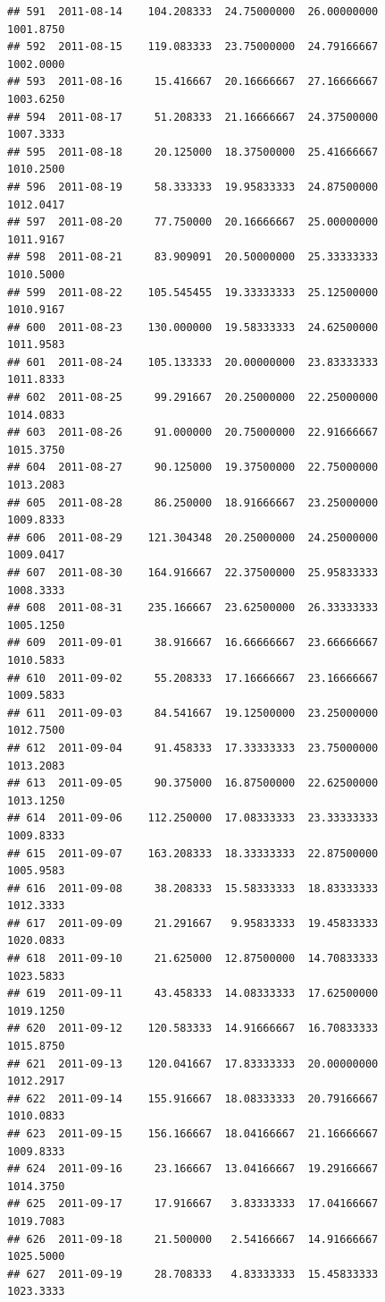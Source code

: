 \documentclass[
]{article}
\begin{document}
\begin{verbatim}
## 591  2011-08-14    104.208333  24.75000000  26.00000000    1001.8750
## 592  2011-08-15    119.083333  23.75000000  24.79166667    1002.0000
## 593  2011-08-16     15.416667  20.16666667  27.16666667    1003.6250
## 594  2011-08-17     51.208333  21.16666667  24.37500000    1007.3333
## 595  2011-08-18     20.125000  18.37500000  25.41666667    1010.2500
## 596  2011-08-19     58.333333  19.95833333  24.87500000    1012.0417
## 597  2011-08-20     77.750000  20.16666667  25.00000000    1011.9167
## 598  2011-08-21     83.909091  20.50000000  25.33333333    1010.5000
## 599  2011-08-22    105.545455  19.33333333  25.12500000    1010.9167
## 600  2011-08-23    130.000000  19.58333333  24.62500000    1011.9583
## 601  2011-08-24    105.133333  20.00000000  23.83333333    1011.8333
## 602  2011-08-25     99.291667  20.25000000  22.25000000    1014.0833
## 603  2011-08-26     91.000000  20.75000000  22.91666667    1015.3750
## 604  2011-08-27     90.125000  19.37500000  22.75000000    1013.2083
## 605  2011-08-28     86.250000  18.91666667  23.25000000    1009.8333
## 606  2011-08-29    121.304348  20.25000000  24.25000000    1009.0417
## 607  2011-08-30    164.916667  22.37500000  25.95833333    1008.3333
## 608  2011-08-31    235.166667  23.62500000  26.33333333    1005.1250
## 609  2011-09-01     38.916667  16.66666667  23.66666667    1010.5833
## 610  2011-09-02     55.208333  17.16666667  23.16666667    1009.5833
## 611  2011-09-03     84.541667  19.12500000  23.25000000    1012.7500
## 612  2011-09-04     91.458333  17.33333333  23.75000000    1013.2083
## 613  2011-09-05     90.375000  16.87500000  22.62500000    1013.1250
## 614  2011-09-06    112.250000  17.08333333  23.33333333    1009.8333
## 615  2011-09-07    163.208333  18.33333333  22.87500000    1005.9583
## 616  2011-09-08     38.208333  15.58333333  18.83333333    1012.3333
## 617  2011-09-09     21.291667   9.95833333  19.45833333    1020.0833
## 618  2011-09-10     21.625000  12.87500000  14.70833333    1023.5833
## 619  2011-09-11     43.458333  14.08333333  17.62500000    1019.1250
## 620  2011-09-12    120.583333  14.91666667  16.70833333    1015.8750
## 621  2011-09-13    120.041667  17.83333333  20.00000000    1012.2917
## 622  2011-09-14    155.916667  18.08333333  20.79166667    1010.0833
## 623  2011-09-15    156.166667  18.04166667  21.16666667    1009.8333
## 624  2011-09-16     23.166667  13.04166667  19.29166667    1014.3750
## 625  2011-09-17     17.916667   3.83333333  17.04166667    1019.7083
## 626  2011-09-18     21.500000   2.54166667  14.91666667    1025.5000
## 627  2011-09-19     28.708333   4.83333333  15.45833333    1023.3333

\end{verbatim}
\end{document}
